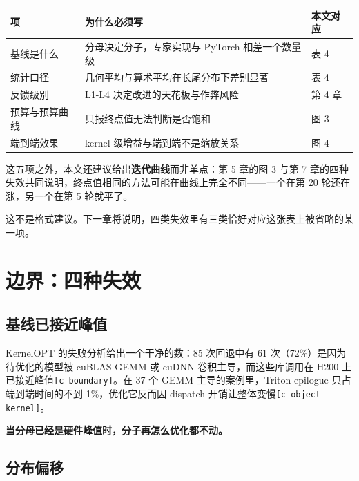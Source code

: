 \begin{table}[t]
\centering
\footnotesize
\setlength{\tabcolsep}{4pt}
\label{tab:5}
\begin{tabularx}{\textwidth}{lXl}
\toprule
项 & 为什么必须写 & 本文对应 \\
\midrule
基线是什么 & 分母决定分子，专家实现与 PyTorch 相差一个数量级 & 表 4 \\
统计口径 & 几何平均与算术平均在长尾分布下差别显著 & 表 4 \\
反馈级别 & L1-\hspace{0pt}L4 决定改进的天花板与作弊风险 & 第 4 章 \\
预算与预算曲线 & 只报终点值无法判断是否饱和 & 图 3 \\
端到端效果 & kernel 级增益与端到端不是缩放关系 & 图 4 \\
\bottomrule
\end{tabularx}
\end{table}

这五项之外，本文还建议给出\textbf{迭代曲线}而非单点：第 5 章的图 3 与第 7 章的四种失效共同说明，终点值相同的方法可能在曲线上完全不同——一个在第 20 轮还在涨，另一个在第 5 轮就平了。



这不是格式建议。下一章将说明，四类失效里有三类恰好对应这张表上被省略的某一项。


\section{边界：四种失效}

\subsection{基线已接近峰值}

KernelOPT 的失败分析给出一个干净的数：85 次回退中有 61 次（72\%）是因为待优化的模型被 cuBLAS GEMM 或 cuDNN 卷积主导，而这些库调用在 H200 上已接近峰值{\scriptsize\texttt{[c-\hspace{0pt}boundary]}}。在 37 个 GEMM 主导的案例里，Triton epilogue 只占端到端时间的不到 1\%，优化它反而因 dispatch 开销让整体变慢{\scriptsize\texttt{[c-\hspace{0pt}object-\hspace{0pt}kernel]}}。


\textbf{当分母已经是硬件峰值时，分子再怎么优化都不动。}


\subsection{分布偏移}


